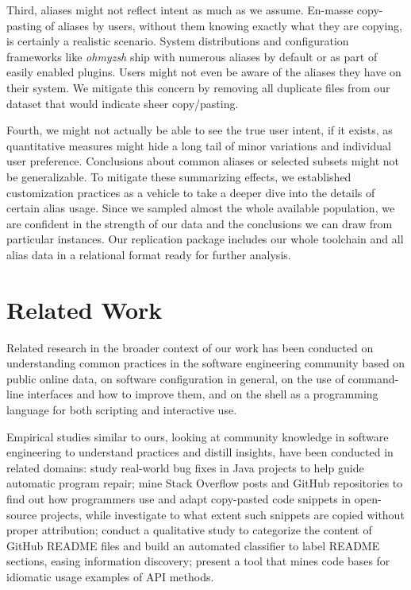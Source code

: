 \documentclass[sigconf,nonacm,screen]{acmart}
\begin{document}
Third, aliases might not reflect intent as much as we assume.
En-masse copy-pasting of aliases by users, without them knowing exactly what they are copying, is certainly a realistic scenario.
System distributions and configuration frameworks like \emph{ohmyzsh} ship with numerous aliases by default or as part of easily enabled plugins.
Users might not even be aware of the aliases they have on their system.
We mitigate this concern by removing all duplicate files from our dataset that would indicate sheer copy/pasting.

Fourth, we might not actually be able to see the true user intent, if it exists, as quantitative measures might hide a long tail of minor variations and individual user preference.
Conclusions about common aliases or selected subsets might not be generalizable.
To mitigate these summarizing effects, we established customization practices as a vehicle to take a deeper dive into the details of certain alias usage.
Since we sampled almost the whole available population, we are confident in the strength of our data and the conclusions we can draw from particular instances.
Our replication package includes our whole toolchain and all alias data in a relational format ready for further analysis.

\section{Related Work}

Related research in the broader context of our work has been conducted on understanding common practices in the software engineering community based on public online data, on software configuration in general, on the use of command-line interfaces and how to improve them, and on the shell as a programming language for both scripting and interactive use.

Empirical studies similar to ours, looking at community knowledge in software engineering to understand practices and distill insights, have been conducted in related domains:
\citet{zhong:15} study real-world bug fixes in Java projects to help guide automatic program repair;
\citet{yang:17} mine Stack Overflow posts and GitHub repositories to find out how programmers use and adapt copy-pasted code snippets in open-source projects, while \citet{baltes:19} investigate to what extent such snippets are copied without proper attribution;
\citet{prana:19} conduct a qualitative study to categorize the content of GitHub README files and build an automated classifier to label README sections, easing information discovery;
\citet{barnaby:20} present a tool that mines code bases for idiomatic usage examples of API methods.
\end{document}
